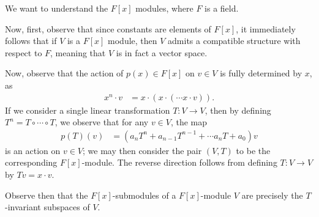 \documentclass[10pt]{mypackage}
\begin{document}
\begin{example}
  We want to understand the $F[x]$ modules, where $F$ is a field.%

  Now, first, observe that since constants are elements of $F[x]$, it immediately follows that if $V$ is a $F[x]$ module, then $V$ admits a compatible structure with respect to $F$, meaning that $V$ is in fact a vector space.%

  Now, observe that the action of $p(x)\in F[x]$ on $v\in V$ is fully determined by $x$, as
  \begin{align*}
    x^{n}\cdot v &= x\cdot \left( x\cdot \left( \cdots x\cdot v \right) \right).
  \end{align*}
  If we consider a single linear transformation $T\colon V\rightarrow V$, then by defining $T^{n} = T\circ\cdots\circ T$, we observe that for any $v\in V$, the map
  \begin{align*}
    p(T)(v) &= \left( a_nT^{n} + a_{n-1}T^{n-1} + \cdots a_n T + a_0 \right)v
  \end{align*}
  is an action on $v\in V$; we may then consider the pair $\left( V,T \right)$ to be the corresponding $F[x]$-module. The reverse direction follows from defining $T\colon V\rightarrow V$ by $Tv = x\cdot v$.%

  Observe then that the $F[x]$-submodules of a $F[x]$-module $V$ are precisely the $T$-invariant subspaces of $V$.
\end{example}
\end{document}
